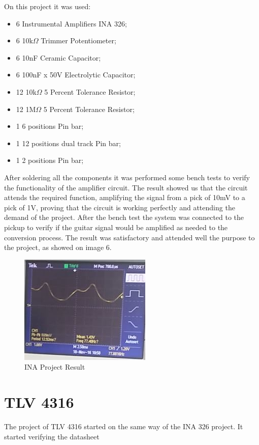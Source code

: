 On this project it was used:

\begin{itemize}
\item 6 Instrumental Amplifiers INA 326;
\item 6 10k$\Omega$ Trimmer Potentiometer;
\item 6 10nF Ceramic Capacitor;
\item 6 100nF x 50V Electrolytic Capacitor;
\item 12 10k$\Omega$ 5 Percent Tolerance Resistor;
\item 12 1M$\Omega$ 5 Percent Tolerance Resistor;
\item 1 6 positions Pin bar;
\item 1 12 positions dual track Pin bar;
\item 1 2 positions Pin bar;
\end{itemize}

After soldering all the components it was performed some bench tests to
verify the functionality of the amplifier circuit. The result showed us that the
circuit attends the required function, amplifying the signal from a pick of 10mV
to a pick of 1V, proving that the circuit is working perfectly and attending the
demand of the project. After the bench test the system was connected to the pickup
to verify if the guitar signal would be amplified as needed to the conversion process.
The result was satisfactory and attended well the purpose to the project, as showed on image 6.

\begin{figure}[!htpb]
\centering
\includegraphics[scale=1]{images/INA_result}
\caption{INA Project Result}
\end{figure}

\section{TLV 4316}
The project of TLV 4316 started on the same way of the INA 326 project.
It started verifying the datasheet

